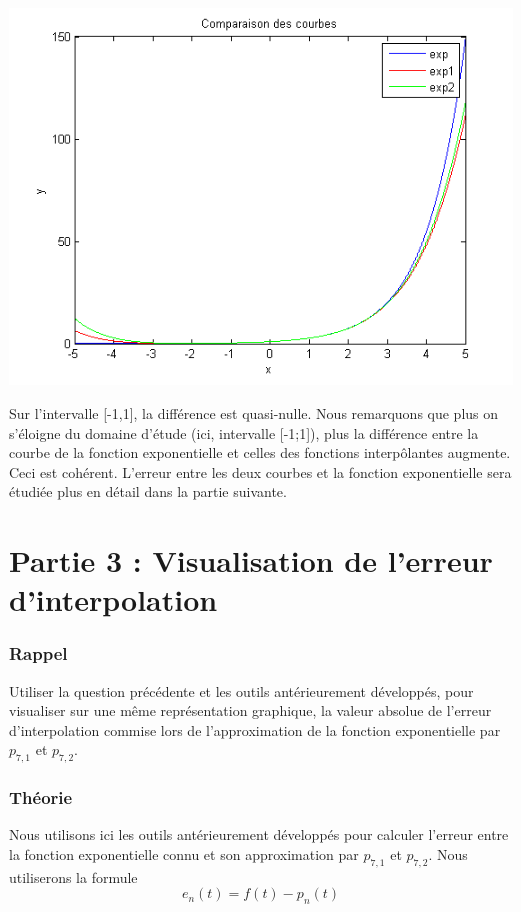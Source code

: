 \documentclass[a4paper,10pt]{report}
\begin{document}
\begin{center}
	\includegraphics[scale=0.8]{comparaison.png}
\end{center}
Sur l'intervalle [-1,1], la différence est quasi-nulle.
Nous remarquons que plus on s'éloigne du domaine d'étude (ici, intervalle [-1;1]), plus la différence entre la courbe de la fonction exponentielle et celles des fonctions interpôlantes augmente. Ceci est cohérent. L'erreur entre les deux courbes et la fonction exponentielle sera étudiée plus en détail dans la partie suivante.

\chapter*{Partie 3 : Visualisation de l’erreur d’interpolation}

\subsection*{Rappel}
Utiliser la question précédente et les outils antérieurement développés, pour
visualiser sur une même représentation graphique, la valeur absolue de l’erreur
d’interpolation commise lors de l’approximation de la fonction exponentielle
par $p_{7,1}$ et $p_{7,2}$.


\subsection*{Théorie}
Nous utilisons ici les outils antérieurement développés pour calculer l'erreur entre la fonction exponentielle connu et son approximation par $p_{7,1}$ et $p_{7,2}$.
Nous utiliserons la formule
\begin{equation}
	e_{n}(t) = f(t) - p_{n}(t)
\end{equation}
\end{document}
